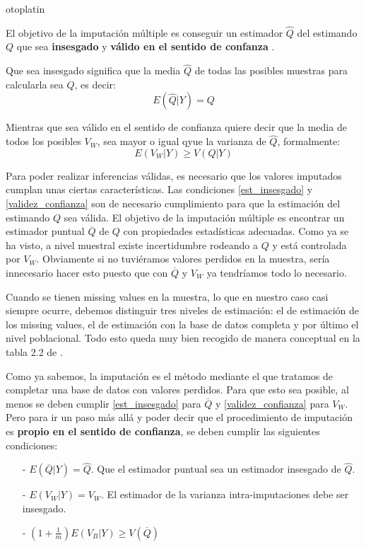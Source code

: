 otoplatin\documentclass[a4paper,openright,12pt]{report}
\begin{document}
El objetivo de la imputación múltiple es conseguir un estimador $\widehat{Q}$ del estimando $Q$ que sea \textbf{insesgado} y \textbf{válido en el sentido de confanza} \cite{Rubin1996}. 

Que sea insesgado significa que la media $\widehat{Q}$ de todas las posibles muestras para calcularla sea $Q$, es decir:
\begin{equation}
E(\widehat{Q}\vert Y)= Q
\label{est_insesgado}
\end{equation} 

Mientras que sea válido en el sentido de confianza quiere decir que la media de todos los posibles $V_{W}$, sea mayor o igual qyue la varianza de $\widehat{Q}$, formalmente:
\begin{equation}
E(V_{W}\vert Y)\geq V(Q\vert Y)
\label{validez_confianza}
\end{equation}

Para poder realizar inferencias válidas, es necesario que los valores imputados cumplan unas ciertas características. Las condiciones \ref{est_insesgado} y \ref{validez_confianza} son de necesario cumplimiento para que la estimación del estimando $Q$ sea válida. El objetivo de la imputación múltiple es encontrar un estimador puntual $\overline{Q}$ de $Q$ con propiedades estadísticas adecuadas. Como ya se ha visto, a nivel muestral existe incertidumbre rodeando a $Q$ y está controlada por $V_{W}$. Obviamente si no tuviéramos valores perdidos en la muestra, sería innecesario hacer esto puesto que con $\overline{Q}$ y $V_{W}$ ya tendríamos todo lo necesario.

Cuando se tienen missing values en la muestra, lo que en nuestro caso casi siempre ocurre, debemos distinguir tres niveles de estimación: el de estimación de los missing values, el de estimación con la base de datos completa y por último el nivel poblacional. Todo esto queda muy bien recogido de manera conceptual en la tabla 2.2 de \cite{VanBuuren2012}.

Como ya sabemos, la imputación es el método mediante el que tratamos de completar una base de datos con valores perdidos. Para que esto sea posible, al menos se deben cumplir \ref{est_insesgado} para $\overline{Q}$ y \ref{validez_confianza} para $V_{W}$. Pero para ir un paso más allá y poder decir que el procedimiento de imputación es \textbf{propio en el sentido de confianza}, se deben cumplir las siguientes condiciones:

\begin{itemize}
\item[-] $E(\overline{Q}\vert Y)=\widehat{Q}$. Que el estimador puntual sea un estimador insesgado de $\widehat{Q}$.
\item[-] $E(V_{W}\vert Y)=V_{W}$. El estimador de la varianza intra-imputaciones debe ser insesgado.
\item[-] $(1+\frac{1}{m})E(V_{B}\vert Y)\geq V(\overline{Q})$
\end{itemize}
\end{document}
